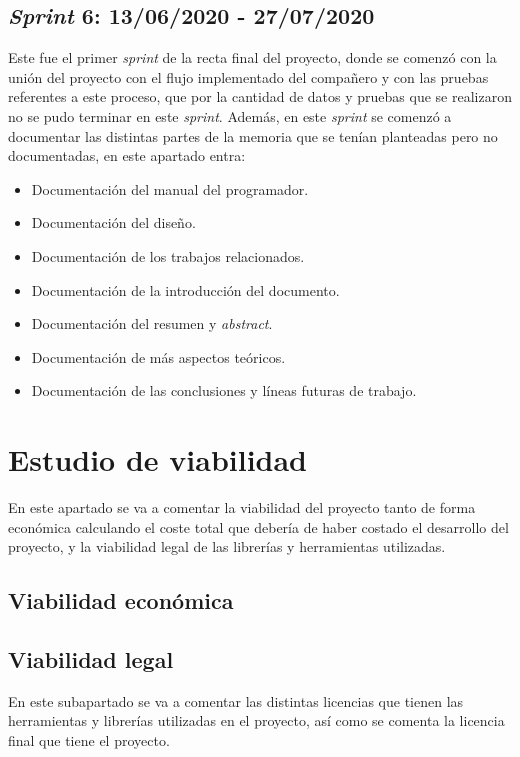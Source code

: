 \subsection{\textit{Sprint} 6: 13/06/2020 - 27/07/2020}
Este fue el primer \textit{sprint} de la recta final del proyecto, donde se comenzó con la unión del proyecto con el flujo implementado del compañero y con las pruebas referentes a este proceso, que por la cantidad de datos y pruebas que se realizaron no se pudo terminar en este \textit{sprint}. Además, en este \textit{sprint} se comenzó a documentar las distintas partes de la memoria que se tenían planteadas pero no documentadas, en este apartado entra:
\begin{itemize}
	\item Documentación del manual del programador.
	\item Documentación del diseño.
	\item Documentación de los trabajos relacionados.
	\item Documentación de la introducción del documento.
	\item Documentación del resumen y \textit{abstract}.
	\item Documentación de más aspectos teóricos.
	\item Documentación de las conclusiones y líneas futuras de trabajo.
\end{itemize}

\section{Estudio de viabilidad}

En este apartado se va a comentar la viabilidad del proyecto tanto de forma económica calculando el coste total que debería de haber costado el desarrollo del proyecto, y la viabilidad legal de las librerías y herramientas utilizadas.

\subsection{Viabilidad económica}

\subsection{Viabilidad legal}
En este subapartado se va a comentar las distintas licencias que tienen las herramientas y librerías utilizadas en el proyecto, así como se comenta la licencia final que tiene el proyecto.

